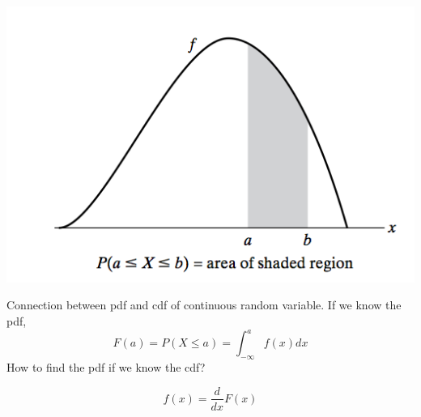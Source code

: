 \documentclass[slidestop,compress,mathserif]{beamer}
\begin{document}
\begin{frame}\frametitle{}
\vspace{-0.5cm}

\begin{center}
\includegraphics[scale = 0.4]{figures/pdf}
\end{center}
\vspace{-0.3cm}

\pause
Connection between pdf and cdf of continuous random variable. If we know the pdf,
\[ F(a) = P(X \leq a) =  \int_{-\infty}^{a} f(x) dx \]
\pause
How to find the pdf if we know the cdf?


\vspace{-0.3cm}
\pause
\[ f(x) = \frac{d}{dx}F(x) \]

\end{frame}
\end{document}
